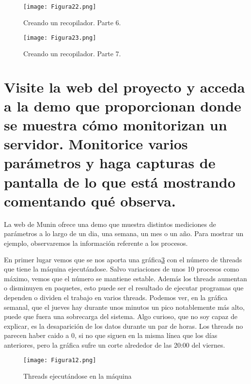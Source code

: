 \begin{figure}[H] 
\centering
\texttt{[image: Figura22.png]}  
\caption{Creando un recopilador. Parte 6.}\label{fig:figura22}
\end{figure}
\begin{figure}[H] 
\centering
\texttt{[image: Figura23.png]}  
\caption{Creando un recopilador. Parte 7.}\label{fig:figura23}
\end{figure}






\section{Visite la web del proyecto y acceda a la demo que proporcionan donde se muestra cómo monitorizan un servidor. Monitorice varios parámetros y haga capturas de pantalla de lo que está mostrando comentando qué observa.}

La web de Munin\cite{munin} ofrece una demo que muestra distintos mediciones de parámetros a lo largo de un dia, una semana, un mes o un año. Para mostrar un
ejemplo, observaremos la información referente a los procesos. 

\vspace{5mm}

En primer lugar vemos que se nos aporta una gráfica\ref{fig:figura12} con el número de threads que tiene la máquina ejecutándose. Salvo variaciones de unos 10 
procesos como máximo, vemos que el número se mantiene estable. Además los threads aumentan o disminuyen en paquetes, esto puede ser el resultado de ejecutar
programas que dependen o dividen el trabajo en varios threads. Podemos ver, en la gráfica semanal, que el jueves hay durante unos minutos un pico notablemente más
alto, puede que fuera una sobrecarga del sistema. Algo curioso, que no soy capaz de explicar, es la desaparición de los datos durante un par de horas. Los threads no
parecen haber caido a 0, si no que siguen en la misma línea que los días anteriores, pero la gráfica sufre un corte alrededor de las 20:00 del viernes. 

\begin{figure}[H] 
\centering
\texttt{[image: Figura12.png]}  
\caption{Threads ejecutándose en la máquina}\label{fig:figura12}
\end{figure}


